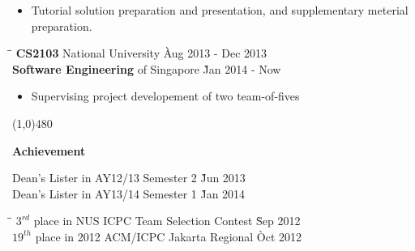 \documentclass[9pt]{article}
\begin{document}
\begin{itemize}
  \item Tutorial solution preparation and presentation, and supplementary meterial preparation.\vspace{-6pt}
\end{itemize}

\begin{tabbing}
\hspace{2.6in}\= \hspace{2.6in}\= \kill
{\bf CS2103} \> National University \`Aug 2013 - Dec 2013\\
{\bf Software Engineering}   \> of Singapore \`Jan 2014 -  Now
\end{tabbing}

\begin{itemize}
  \item Supervising project developement of two team-of-fives \vspace{-6pt}
\end{itemize}

\centerline{\line(1,0){480}}

\medskip

\centerline {\Large \bf Achievement}

\medskip

\begin{tabbing}
\hspace{12pt} \textbullet \hspace{3pt} Dean's Lister in AY12/13 Semester 2 \` Jun 2013 \\
\hspace{12pt} \textbullet \hspace{3pt} Dean's Lister in AY13/14 Semester 1 \` Jan 2014 \\
\end{tabbing}\vspace{-18pt}

\begin{tabbing}
\hspace{5.2in}\= \= \kill
\hspace{12pt} \textbullet \hspace{3pt} $3^{rd}$ place in NUS ICPC Team Selection Contest \` Sep 2012 \\
\hspace{12pt} \textbullet \hspace{3pt} $19^{th}$ place in 2012 ACM/ICPC Jakarta Regional \` Oct 2012 \\
\end{tabbing}\vspace{-18pt}
\end{document}
